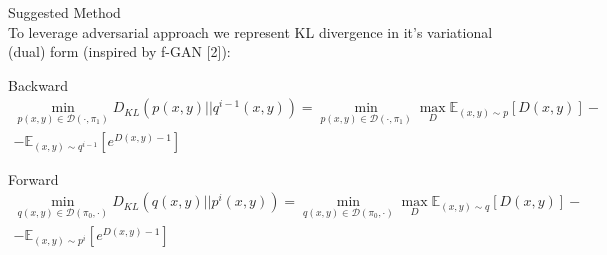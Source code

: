 \documentclass[10pt,pdf,hyperref={unicode}]{beamer}
\begin{document}
\begin{frame}{Suggested Method}
~\\[-1mm]
To leverage adversarial approach we represent KL divergence in it's variational (dual) form (inspired by f-GAN [2]):
\begin{block}{Backward}
    \begin{equation*}
        \begin{split}
            \min_{p(x,y)\in\mathcal{D}(\cdot, \pi_1)} D_{KL}(p(x,y)||q^{i-1}(x,y)) = \min_{p(x,y)\in\mathcal{D}(\cdot, \pi_1)}\max_{D}\mathbb{E}_{(x,y)\sim p}\left[D(x,y)\right] - \\ - \mathbb{E}_{(x,y)\sim q^{i-1}}\left[e^{D(x,y) - 1}\right]
        \end{split}
    \end{equation*}
\end{block}

\begin{block}{Forward}
    \begin{equation*}
        \begin{split}
            \min_{q(x,y)\in\mathcal{D}(\pi_0, \cdot)} D_{KL}(q(x,y)||p^{i}(x,y)) = \min_{q(x,y)\in\mathcal{D}(\pi_0, \cdot)}\max_{D}\mathbb{E}_{(x,y)\sim q}\left[D(x,y)\right] - \\ - \mathbb{E}_{(x,y)\sim p^{i}}\left[e^{D(x,y) - 1}\right]
        \end{split}
    \end{equation*}
\end{block}
\end{frame}
\end{document}
